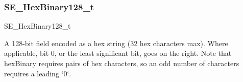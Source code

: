 \subsubsection{\texorpdfstring{S\+E\+\_\+\+Hex\+Binary128\+\_\+t}{SE\_HexBinary128\_t}}
{\footnotesize\ttfamily S\+E\+\_\+\+Hex\+Binary128\+\_\+t}

A 128-\/bit field encoded as a hex string (32 hex characters max). Where applicable, bit 0, or the least significant bit, goes on the right. Note that hex\+Binary requires pairs of hex characters, so an odd number of characters requires a leading \char`\"{}0\char`\"{}. 